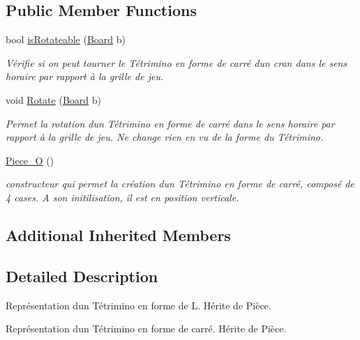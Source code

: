\subsection*{Public Member Functions}
\begin{DoxyCompactItemize}
\item 
bool \hyperlink{classPiece__O_af82900ecec4e7bd058d43825293d8bff}{is\+Rotateable} (\hyperlink{classBoard}{Board} b)
\begin{DoxyCompactList}\small\item\em Vérifie si on peut tourner le Tétrimino en forme de carré d\textquotesingle{}un cran dans le sens horaire par rapport à la grille de jeu. \end{DoxyCompactList}\item 
void \hyperlink{classPiece__O_a69812f938582f176cd4cca997cbb87c1}{Rotate} (\hyperlink{classBoard}{Board} b)
\begin{DoxyCompactList}\small\item\em Permet la rotation d\textquotesingle{}un Tétrimino en forme de carré dans le sens horaire par rapport à la grille de jeu. Ne change rien en vu de la forme du Tétrimino. \end{DoxyCompactList}\item 
\mbox{\label{classPiece__O_aa6abd4c92e4ca830993585f99b7d6a2a}} 
\hyperlink{classPiece__O_aa6abd4c92e4ca830993585f99b7d6a2a}{Piece\+\_\+O} ()
\begin{DoxyCompactList}\small\item\em constructeur qui permet la création d\textquotesingle{}un Tétrimino en forme de carré, composé de 4 cases. A son initilisation, il est en position verticale. \end{DoxyCompactList}\end{DoxyCompactItemize}
\subsection*{Additional Inherited Members}


\subsection{Detailed Description}
Représentation d\textquotesingle{}un Tétrimino en forme de L. Hérite de Pièce. 

Représentation d\textquotesingle{}un Tétrimino en forme de carré. Hérite de Pièce.

